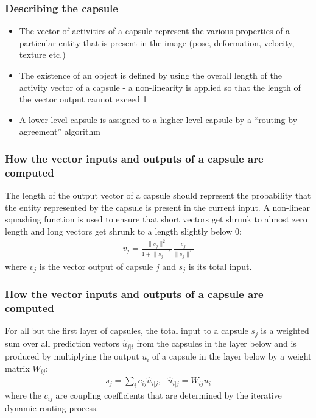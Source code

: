 \documentclass{beamer}
\begin{document}
\begin{frame}
\frametitle{Describing the capsule}
\center
\begin{itemize}
	\item The vector of activities of a capsule represent the various properties of a particular entity that is present in the image (pose, deformation, velocity, texture etc.)
	\item The existence of an object is defined by using the overall length of the activity vector of a capsule - a non-linearity is applied so that the length of the vector output cannot exceed 1
	\item A lower level capsule is assigned to a higher level capsule by a ``routing-by-agreement'' algorithm
\end{itemize}
\end{frame}

\begin{frame}
\frametitle{How the vector inputs and outputs of a capsule are computed}
The length of the output vector of a capsule should represent the probability that the entity represented by the capsule is present in the current input. A non-linear squashing function is used to ensure that short vectors get shrunk to almost zero length and long vectors get shrunk to a length slightly below 0:
\begin{equation}
\begin{split}
v_j = \frac{\lVert s_j \rVert^2}{1 + \lVert s_j \rVert^2} \frac{s_j}{\lVert s_j \rVert^2}
\end{split}
\end{equation}
where \(v_j\) is the vector output of capsule \(j\) and \(s_j\) is its total input.
\end{frame}

\begin{frame}
\frametitle{How the vector inputs and outputs of a capsule are computed}
For all but the first layer of capsules, the total input to a capsule \(s_j\) is a weighted sum over all prediction vectors \(\hat{u}_{j|i}\) from the capsules in the layer below and is produced by multiplying the output \(u_i\) of a capsule in the layer below by a weight matrix \(W_{ij}\):
\begin{equation}
\begin{split}
s_j = \sum_{i}c_{ij}\hat{u}_{i|j}, \ \ \ \hat{u}_{i|j} = W_{ij}u_i
\end{split}
\end{equation}
where the \(c_{ij}\) are coupling coefficients that are determined by the iterative dynamic routing process.
\end{frame}
\end{document}
